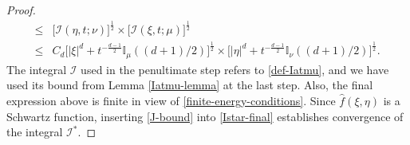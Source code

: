 \documentclass[a4paper,11pt]{amsart}
\numberwithin{equation}{section}
\begin{document}
\begin{proof}
\begin{align}
  \leq & \bigl[\mathscr{I}(\eta, t; \nu) \bigr]^{\frac{1}{2}} \times \bigl[\mathscr{I}(\xi, t; \mu) \bigr]^{\frac{1}{2}} \nonumber \\ 
  \leq &C_d \bigl[|\xi|^d + t^{-\frac{d-1}{2}} \mathbb I_{\mu} ((d+1)/2)\bigr]^{\frac{1}{2}} \times \bigl[|\eta|^d + t^{-\frac{d-1}{2}} \mathbb I_{\nu} ((d+1)/2)\bigr]^{\frac{1}{2}}. \label{J-bound}
\end{align} 
The integral $\mathscr{I}$ used in the penultimate step refers to \eqref{def-Iatmu}, and we have used its bound from Lemma \ref{Iatmu-lemma} at the last step. Also, the final expression above is finite in view of \eqref{finite-energy-conditions}. Since $\widehat{f}(\xi, \eta)$ is a Schwartz function, inserting \eqref{J-bound} into \eqref{Istar-final} establishes convergence of the integral $\mathscr{I}^{\ast}$.   
\end{proof} 
\end{document}
